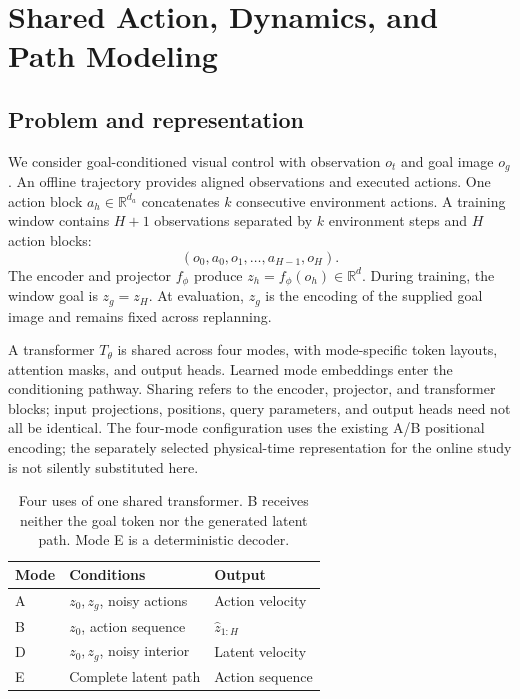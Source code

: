 \section{Shared Action, Dynamics, and Path Modeling}
\label{sec:method}



\subsection{Problem and representation}

We consider goal-conditioned visual control with observation $o_t$ and goal image $o_g$. An offline trajectory provides aligned observations and executed actions. One action block $a_h\in\mathbb{R}^{d_a}$ concatenates $k$ consecutive environment actions. A training window contains $H+1$ observations separated by $k$ environment steps and $H$ action blocks:
\begin{equation}
  (o_0,a_0,o_1,\ldots,a_{H-1},o_H).
\end{equation}
The encoder and projector $f_\phi$ produce $z_h=f_\phi(o_h)\in\mathbb{R}^d$. During training, the window goal is $z_g=z_H$. At evaluation, $z_g$ is the encoding of the supplied goal image and remains fixed across replanning.

A transformer $T_\theta$ is shared across four modes, with mode-specific token layouts, attention masks, and output heads. Learned mode embeddings enter the conditioning pathway. Sharing refers to the encoder, projector, and transformer blocks; input projections, positions, query parameters, and output heads need not all be identical.
The four-mode configuration uses the existing A/B positional encoding; the separately selected physical-time representation for the online study is not silently substituted here.

\begin{table}[t]
  \centering
  \small
  \begin{tabular}{lll}
    \toprule
    Mode & Conditions & Output \\
    \midrule
    A & $z_0,z_g$, noisy actions & Action velocity \\
    B & $z_0$, action sequence & $\hat z_{1:H}$ \\
    D & $z_0,z_g$, noisy interior & Latent velocity \\
    E & Complete latent path & Action sequence \\
    \bottomrule
  \end{tabular}
  \caption{Four uses of one shared transformer. B receives neither the goal token nor the generated latent path. Mode E is a deterministic decoder.}
  \label{tab:modes}
\end{table}


